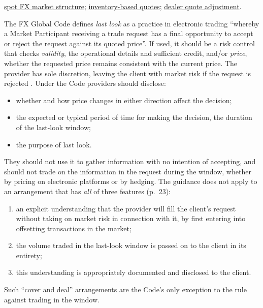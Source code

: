 \begin{qfmodel}
 \hyperref[def:fx-market-structure]{spot FX market structure}; \hyperref[mod:inventory-based-quotes]{inventory-based quotes}; \hyperref[meth:dealer-quote-adjustment]{dealer quote adjustment}.

\end{qfmodel}

\begin{qfmechanism}\label{mech:fx-last-look}
 The FX Global Code defines \emph{last look} as a practice in electronic trading ``whereby a Market Participant receiving a trade request has a final opportunity to accept or reject the request against its quoted price''. If used, it should be a risk control that checks \emph{validity}, the operational details and sufficient credit, and/or \emph{price}, whether the requested price remains consistent with the current price. The provider has sole discretion, leaving the client with market risk if the request is rejected \citep[Principle~17, pp.~22--23]{exp-fx-code}. Under the Code providers should disclose:
\begin{itemize}
\item whether and how price changes in either direction affect the decision;
\item the expected or typical period of time for making the decision, the duration of the last-look window;
\item the purpose of last look.
\end{itemize}
They should not use it to gather information with no intention of accepting, and should not trade on the information in the request during the window, whether by pricing on electronic platforms or by hedging. The guidance does not apply to an arrangement that has \emph{all} of three features (p.~23):
\begin{enumerate}
\item an explicit understanding that the provider will fill the client's request without taking on market risk in connection with it, by first entering into offsetting transactions in the market;
\item the volume traded in the last-look window is passed on to the client in its entirety;
\item this understanding is appropriately documented and disclosed to the client.
\end{enumerate}
Such ``cover and deal'' arrangements are the Code's only exception to the rule against trading in the window.


\end{qfmechanism}
